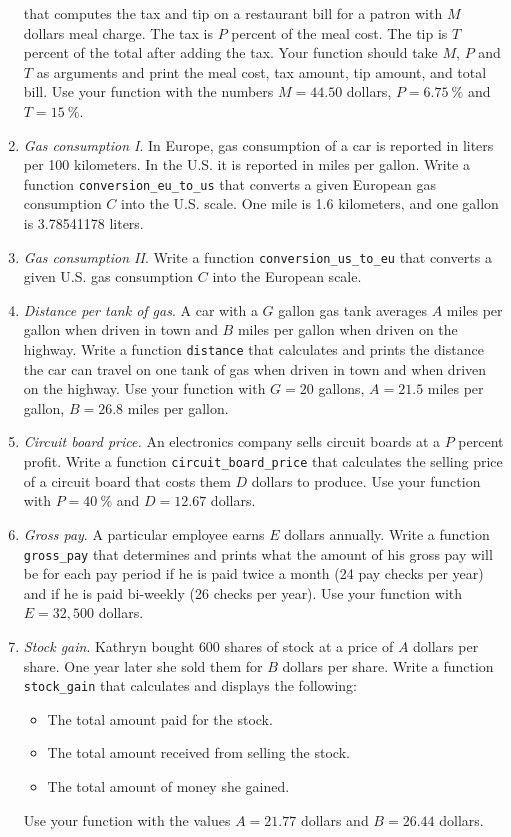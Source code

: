 \begin{enumerate}
that computes the tax and tip on a restaurant bill for a patron with 
$M$ dollars meal charge. The tax is $P$ percent of the meal cost. The tip is $T$ percent of the total after 
adding the tax. Your function should take $M$, $P$ and $T$ as arguments and print the meal cost, 
tax amount, tip amount, and total bill. Use your function with the numbers $M = 44.50$ dollars, 
$P = 6.75 \ \%$ and $T = 15 \ \%$. 
\item {\em Gas consumption I}. In Europe, gas consumption of a car is reported in liters per 100 kilometers. In the U.S. 
it is reported in miles per gallon. Write a function {\tt conversion\_eu\_to\_us} that converts a given European 
gas consumption $C$ into the U.S. scale. One mile is 1.6 kilometers, and one gallon is 3.78541178 liters. 
\item {\em Gas consumption II}. Write a function {\tt conversion\_us\_to\_eu} that converts a given U.S.
gas consumption $C$ into the European scale.
\item {\em Distance per tank of gas}. A car with a $G$ gallon gas tank averages $A$ miles per gallon 
when driven in town and 
$B$ miles per gallon when driven on the highway. Write a function {\tt distance} that calculates and prints 
the distance the car can travel on one tank of gas when driven in town and when driven on the highway. 
Use your function with $G = 20$ gallons, $A = 21.5$ miles per gallon, $B = 26.8$ miles per gallon. 
\item {\em Circuit board price.} An electronics company sells circuit boards at a $P$ percent profit. 
Write a function {\tt circuit\_board\_price} 
that calculates the selling price of a circuit board that costs them $D$ dollars to
produce. Use your function with $P = 40\ \%$ and $D = 12.67$ dollars.
\item {\em Gross pay}. A particular employee earns $E$ dollars annually. Write a function 
{\tt gross\_pay} that determines and prints what the amount of his gross pay will be for each pay period 
if he is paid twice a month (24 pay checks per year) and if he is paid bi-weekly (26 checks per 
year). Use your function with $E = 32,500$ dollars.
\item {\em Stock gain}. Kathryn bought $600$ shares of stock at a price of $A$ dollars per share. 
One year later she 
sold them for $B$ dollars per share. Write a function {\tt stock\_gain} that calculates and 
displays the following:
\begin{itemize}
\item The total amount paid for the stock.
\item The total amount received from selling the stock.
\item The total amount of money she gained.
\end{itemize}
Use your function with the values $A = 21.77$ dollars and $B = 26.44$ dollars.
\end{enumerate}

